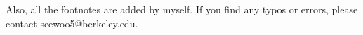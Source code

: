 \documentclass[letterpaper, 12pt]{article}
\newcommand{\1}{\mathds{1}}	%
\theoremstyle{definition}
\numberwithin{equation}{subsection}
\numberwithin{theorem}{subsection}
\numberwithin{proposition}{section}
\numberwithin{lemma}{section}
\numberwithin{definition}{subsection}
\begin{document}
Also, all the footnotes are added by myself.
If you find any typos or errors, please contact seewoo5@berkeley.edu.

\newpage

















\nocite{*}






\end{document}
